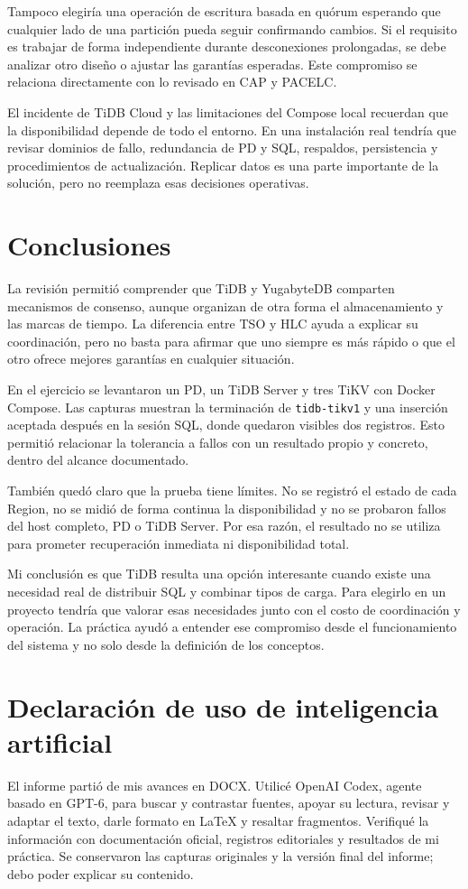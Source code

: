 \documentclass[11pt,a4paper]{article}
\begin{document}
Tampoco elegiría una operación de escritura basada en quórum esperando que cualquier lado de una partición pueda seguir confirmando cambios. Si el requisito es trabajar de forma independiente durante desconexiones prolongadas, se debe analizar otro diseño o ajustar las garantías esperadas. Este compromiso se relaciona directamente con lo revisado en CAP y PACELC.

El incidente de TiDB Cloud y las limitaciones del Compose local recuerdan que la disponibilidad depende de todo el entorno. En una instalación real tendría que revisar dominios de fallo, redundancia de PD y SQL, respaldos, persistencia y procedimientos de actualización. Replicar datos es una parte importante de la solución, pero no reemplaza esas decisiones operativas.

\section{Conclusiones}
La revisión permitió comprender que TiDB y YugabyteDB comparten mecanismos de consenso, aunque organizan de otra forma el almacenamiento y las marcas de tiempo. La diferencia entre TSO y HLC ayuda a explicar su coordinación, pero no basta para afirmar que uno siempre es más rápido o que el otro ofrece mejores garantías en cualquier situación.

En el ejercicio se levantaron un PD, un TiDB Server y tres TiKV con Docker Compose. Las capturas muestran la terminación de \texttt{tidb-tikv1} y una inserción aceptada después en la sesión SQL, donde quedaron visibles dos registros. Esto permitió relacionar la tolerancia a fallos con un resultado propio y concreto, dentro del alcance documentado.

También quedó claro que la prueba tiene límites. No se registró el estado de cada Region, no se midió de forma continua la disponibilidad y no se probaron fallos del host completo, PD o TiDB Server. Por esa razón, el resultado no se utiliza para prometer recuperación inmediata ni disponibilidad total.

Mi conclusión es que TiDB resulta una opción interesante cuando existe una necesidad real de distribuir SQL y combinar tipos de carga. Para elegirlo en un proyecto tendría que valorar esas necesidades junto con el costo de coordinación y operación. La práctica ayudó a entender ese compromiso desde el funcionamiento del sistema y no solo desde la definición de los conceptos.

\section{Declaración de uso de inteligencia artificial}
El informe partió de mis avances en DOCX. Utilicé OpenAI Codex, agente basado en GPT-6, para buscar y contrastar fuentes, apoyar su lectura, revisar y adaptar el texto, darle formato en LaTeX y resaltar fragmentos. Verifiqué la información con documentación oficial, registros editoriales y resultados de mi práctica. Se conservaron las capturas originales y la versión final del informe; debo poder explicar su contenido.
\end{document}
